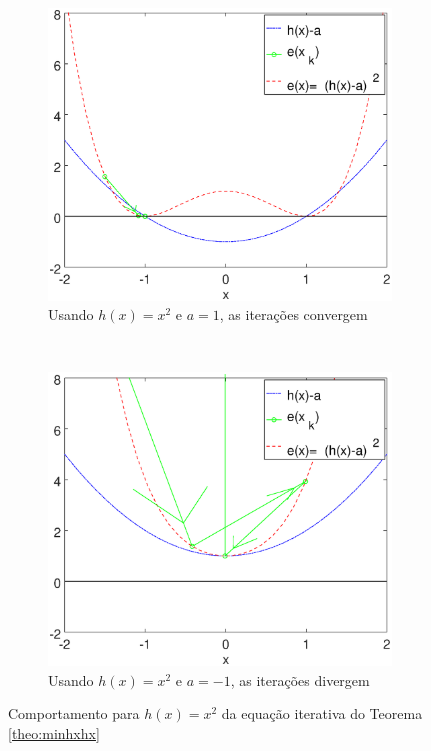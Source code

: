 \begin{figure}[!h]
    \centering
    \begin{subfigure}[b]{0.45\textwidth}
        \includegraphics[width=\textwidth]{chapters/minimization/mfiles/hx_a/minimizando_hx_a_1.eps}
        \caption{Usando $h(x)=x^2$ e $a=1$, as iterações convergem}
        \label{fig:hxacasesa}
    \end{subfigure}
    ~ %
    \begin{subfigure}[b]{0.45\textwidth}
        \includegraphics[width=\textwidth]{chapters/minimization/mfiles/hx_a/minimizando_hx_a_2.eps}
        \caption{Usando $h(x)=x^2$ e $a=-1$, as iterações divergem}
        \label{fig:hxacasesb}
    \end{subfigure}
    \caption{Comportamento para $h(x)=x^2$ da equação iterativa do Teorema \ref{theo:minhxhx}}
    \label{fig:hxacases}
\end{figure}

